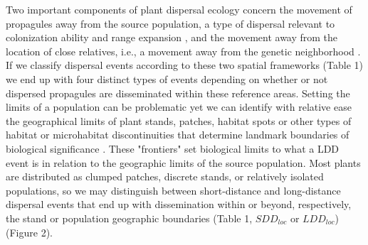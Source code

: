 \documentclass[a4paper, 12pt]{article}
\begin{document}
\begin{linenumbers}
Two important components of plant dispersal ecology concern the movement of propagules away from the source population, a type of dispersal relevant to colonization ability and range expansion \citep{Howe:2004}, and the movement away from the location of close relatives, i.e., a movement away from the genetic neighborhood \citep{Hardesty:2006lr,Jones:2008il}. If we classify dispersal events according to these two spatial frameworks (Table 1) we end up with four distinct types of events depending on whether or not dispersed propagules are disseminated within these reference areas. Setting the limits of a population can be problematic \citep{Waples:2006ev} yet we can identify with relative ease the geographical limits of plant stands, patches, habitat spots or other types of habitat or microhabitat discontinuities that determine landmark boundaries of biological significance \citep[see][for further discussion of boundaries for dispersal]{Kinlan:2005fb}. These "frontiers" set biological limits to what a LDD event is in relation to the geographic limits of the source population. Most plants are distributed as clumped patches, discrete stands, or relatively isolated populations, so we may distinguish between short-distance and long-distance dispersal events that end up with dissemination within or beyond, respectively, the stand or population geographic boundaries (Table 1, $SDD_{loc}$ or $LDD_{loc}$) (Figure 2).  


\end{linenumbers}
\end{document}
